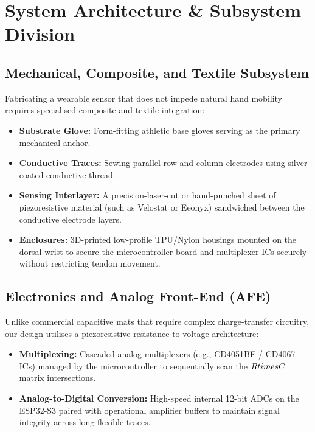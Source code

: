 \documentclass[11pt,a4paper]{article}
\begin{document}
\section{System Architecture & Subsystem Division}

\subsection{Mechanical, Composite, and Textile Subsystem}
Fabricating a wearable sensor that does not impede natural hand mobility requires specialised composite and textile integration:
\begin{itemize}
    \item \textbf{Substrate Glove:} Form-fitting athletic base gloves serving as the primary mechanical anchor.
    \item \textbf{Conductive Traces:} Sewing parallel row and column electrodes using silver-coated conductive thread.
    \item \textbf{Sensing Interlayer:} A precision-laser-cut or hand-punched sheet of piezoresistive material (such as Velostat or Eeonyx) sandwiched between the conductive electrode layers.
    \item \textbf{Enclosures:} 3D-printed low-profile TPU/Nylon housings mounted on the dorsal wrist to secure the microcontroller board and multiplexer ICs securely without restricting tendon movement.
\end{itemize}

\subsection{Electronics and Analog Front-End (AFE)}
Unlike commercial capacitive mats that require complex charge-transfer circuitry, our design utilises a piezoresistive resistance-to-voltage architecture:
\begin{itemize}
    \item \textbf{Multiplexing:} Cascaded analog multiplexers (e.g., CD4051BE / CD4067 ICs) managed by the microcontroller to sequentially scan the $R \\times C$ matrix intersections.
    \item \textbf{Analog-to-Digital Conversion:} High-speed internal 12-bit ADCs on the ESP32-S3 paired with operational amplifier buffers to maintain signal integrity across long flexible traces.
\end{itemize}
\end{document}
